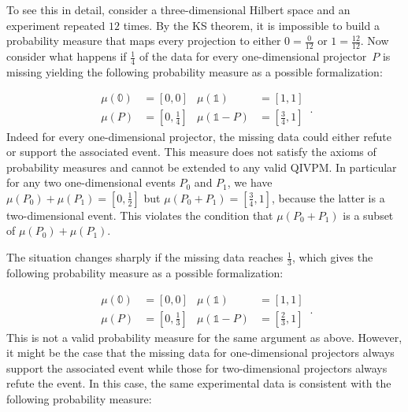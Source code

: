 \documentclass[english,reprint, aps, prl,superscriptaddress, showpacs,
showkeys, longbibliography, amsmath, amssymb, floatfix]{revtex4-1}
\theoremstyle{plain}
\theoremstyle{definition}
\newcommand{\imposs}{\ensuremath{\left[0,0\right]}}
\newcommand{\necess}{\ensuremath{\left[1,1\right]}}
\begin{document}
To see this in detail, consider a three-dimensional Hilbert space
and an experiment repeated $12$ times. By the KS theorem, it is impossible
to build a probability measure that maps every projection to either
$0=\frac{0}{12}$ or $1=\frac{12}{12}$. Now consider what happens
if $\frac{1}{4}$ of the data for every one-dimensional projector~$P$
is missing yielding the following probability measure as a possible
formalization:

\begin{equation}
\begin{aligned}\mu\left(\mathbb{0}\right) & =\imposs & \mu\left(\mathbb{1}\right) & =\necess\\
\mu\left(P\right) & =\left[0,\tfrac{1}{4}\right] & \mu\left(\mathbb{1}-P\right) & =\left[\tfrac{3}{4},1\right]
\end{aligned}
\,.
\end{equation}
Indeed for every one-dimensional projector, the missing data could
either refute or support the associated event. This measure does not
satisfy the axioms of probability measures and cannot be extended
to any valid QIVPM. In particular for any two one-dimensional events
$P_{0}$ and $P_{1}$, we have $\mu\left(P_{0}\right)+\mu\left(P_{1}\right)=\left[0,\tfrac{1}{2}\right]$
but $\mu\left(P_{0}+P_{1}\right)=\left[\tfrac{3}{4},1\right]$, because
the latter is a two-dimensional event. This violates the condition
that $\mu\left(P_{0}+P_{1}\right)$ is a subset of $\mu\left(P_{0}\right)+\mu\left(P_{1}\right)$.

The situation changes sharply if the missing data reaches $\frac{1}{3}$,
which gives the following probability measure as a possible formalization:

\begin{equation}
\begin{aligned}\mu\left(\mathbb{0}\right) & =\imposs & \mu\left(\mathbb{1}\right) & =\necess\\
\mu\left(P\right) & =\left[0,\tfrac{1}{3}\right] & \mu\left(\mathbb{1}-P\right) & =\left[\tfrac{2}{3},1\right]
\end{aligned}
\,.
\end{equation}
This is not a valid probability measure for the same argument as above.
However, it might be the case that the missing data for one-dimensional
projectors always support the associated event while those for two-dimensional
projectors always refute the event. In this case, the same experimental
data is consistent with the following probability measure:
\end{document}

